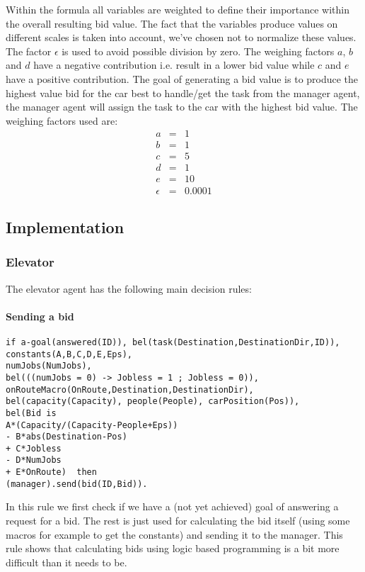 \documentclass[a4paper,11pt]{article}
\begin{document}
Within the formula all variables are weighted to define their importance within the overall resulting bid value. The fact that the variables produce values on different scales is taken into account, we've chosen not to normalize these values. The factor $\epsilon$ is used to avoid possible division by zero. The weighing factors $a$, $b$ and $d$ have a negative contribution i.e. result in a lower bid value while $c$ and $e$ have a positive contribution. The goal of generating a bid value is to produce the highest value bid for the car best to handle/get the task from the manager agent, the manager agent will assign the task to the car with the highest bid value. The weighing factors used are:
\[\begin{array}{lcl}
a & = & 1\\
b & = & 1\\
c & = & 5\\
d & = & 1\\
e & = & 10\\
\epsilon & = & 0.0001
\end{array}\]

\subsection{Implementation}
\subsubsection{Elevator}
The elevator agent has the following main decision rules:

\paragraph*{Sending a bid}
\begin{verbatim}
if a-goal(answered(ID)), bel(task(Destination,DestinationDir,ID)),
constants(A,B,C,D,E,Eps),
numJobs(NumJobs),		
bel(((numJobs = 0) -> Jobless = 1 ; Jobless = 0)),
onRouteMacro(OnRoute,Destination,DestinationDir),
bel(capacity(Capacity), people(People), carPosition(Pos)),
bel(Bid is 
A*(Capacity/(Capacity-People+Eps)) 
- B*abs(Destination-Pos)
+ C*Jobless
- D*NumJobs
+ E*OnRoute)  then
(manager).send(bid(ID,Bid)).
\end{verbatim}

In this rule we first check if we have a (not yet achieved) goal of answering a request for a bid. The rest is just used for calculating the bid itself (using some macros for example to get the constants) and sending it to the manager. This rule shows that calculating bids using logic based programming is a bit more difficult than it needs to be.
\end{document}
